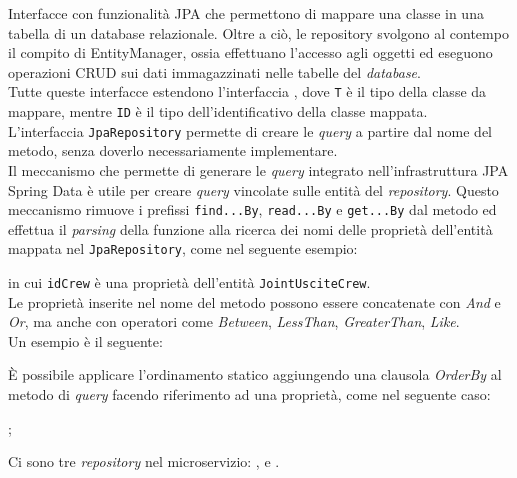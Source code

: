 \label{Repository}
\noindent Interfacce con funzionalità \gls{JPA} che permettono di mappare una
classe in
una tabella
di un database relazionale. Oltre a ciò, le repository svolgono al contempo il
compito di \gls{EntityManager}, ossia effettuano
l'accesso agli oggetti ed eseguono operazioni \gls{CRUD} sui dati immagazzinati
nelle tabelle del \textit{database}.\\
Tutte queste interfacce estendono l'interfaccia ,
dove \texttt{T} è il tipo della classe da mappare, mentre \texttt{ID} è il tipo
dell'identificativo della classe mappata.\\
L'interfaccia \texttt{JpaRepository} permette di creare le \textit{query} a
partire dal nome del metodo, senza doverlo necessariamente implementare.\\
Il meccanismo che permette di generare le \textit{query} integrato
nell'infrastruttura JPA Spring Data è utile per creare \textit{query} vincolate
sulle entità del \textit{repository}. Questo meccanismo rimuove i prefissi
\texttt{find...By}, \texttt{read...By} e \texttt{get...By} dal metodo ed
effettua il \textit{parsing} della funzione alla ricerca dei nomi delle
proprietà dell'entità mappata nel \texttt{JpaRepository}, come nel seguente
esempio:
\begin{center}
\end{center}
in cui \texttt{idCrew} è una proprietà dell'entità \texttt{JointUsciteCrew}.\\
Le proprietà inserite nel nome del metodo possono essere concatenate con
\textit{And} e \textit{Or}, ma anche con operatori come \textit{Between},
\textit{LessThan}, \textit{GreaterThan}, \textit{Like}. \\
Un esempio è il seguente:
\begin{center}
\end{center}
È possibile applicare l'ordinamento statico aggiungendo una clausola
\textit{OrderBy} al metodo di \textit{query} facendo riferimento ad una
proprietà, come nel seguente caso:
\begin{center}
    ;
\end{center}
Ci sono tre \textit{repository} nel \gls{microservizio}:
,  e
.
\label{JointUsciteCrewRepository}
